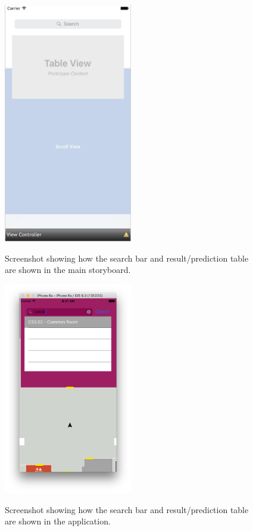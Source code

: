 \documentclass[main.tex]{subfiles}
\begin{document}
\begin{figure}[H]
\centering
\includegraphics[width=0.5\textwidth]{images-implementation/IOSRoomSearchInStoryboard.png}
\label{IOSRoomSearchInStoryboard}
\caption{Screenshot showing how the search bar and result/prediction table are shown in the main storyboard.}
\end{figure}


\begin{figure}[H]
\centering
\includegraphics[width=0.5\textwidth]{images-implementation/IOSRoomSearchInApp.png}
\label{IOSRoomSearchInApp}
\caption{Screenshot showing how the search bar and result/prediction table are shown in the application.}
\end{figure}
\end{document}
